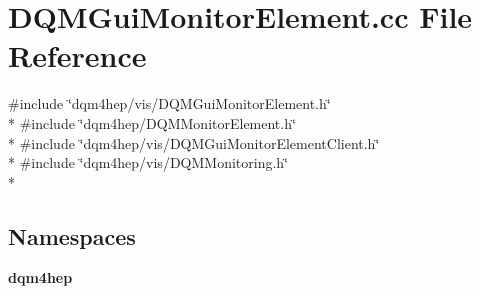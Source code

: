 \section{D\+Q\+M\+Gui\+Monitor\+Element.\+cc File Reference}
\label{DQMGuiMonitorElement_8cc}
{\ttfamily \#include \char`\"{}dqm4hep/vis/\+D\+Q\+M\+Gui\+Monitor\+Element.\+h\char`\"{}}\\*
{\ttfamily \#include \char`\"{}dqm4hep/\+D\+Q\+M\+Monitor\+Element.\+h\char`\"{}}\\*
{\ttfamily \#include \char`\"{}dqm4hep/vis/\+D\+Q\+M\+Gui\+Monitor\+Element\+Client.\+h\char`\"{}}\\*
{\ttfamily \#include \char`\"{}dqm4hep/vis/\+D\+Q\+M\+Monitoring.\+h\char`\"{}}\\*
\subsection*{Namespaces}
\begin{DoxyCompactItemize}
\item 
 {\bf dqm4hep}
\end{DoxyCompactItemize}
